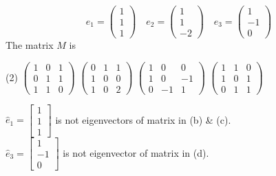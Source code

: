 \begin{questions}
\begin{minipage}{\textwidth}
	$$
	e_{1}=\left(\begin{array}{l}
	1 \\
	1 \\
	1
	\end{array}\right) \quad e_{2}=\left(\begin{array}{c}
	1 \\
	1 \\
	-2
	\end{array}\right) \quad e_{3}=\left(\begin{array}{c}
	1 \\
	-1 \\
	0
	\end{array}\right)
	$$
	The matrix $M$ is
\end{minipage}
\begin{tasks}(2)
	\task[\textbf{A.}] $\left(\begin{array}{lll}1 & 0 & 1 \\ 0 & 1 & 1 \\ 1 & 1 & 0\end{array}\right)$
	\task[\textbf{B.}]   $\left(\begin{array}{lll}0 & 1 & 1 \\ 1 & 0 & 0 \\ 1 & 0 & 2\end{array}\right)$
	\task[\textbf{C.}] $\left(\begin{array}{ccc}1 & 0 & 0 \\ 1 & 0 & -1 \\ 0 & -1 & 1\end{array}\right)$
	\task[\textbf{D.}] $\left(\begin{array}{lll}1 & 1 & 0 \\ 1 & 0 & 1 \\ 0 & 1 & 1\end{array}\right)$
\end{tasks}
\begin{answer}
	$\hat{e}_{1}=\left[\begin{array}{l}1 \\ 1 \\ 1\end{array}\right]$ is not eigenvectors of matrix in (b) \& (c).\\
	$\hat{e}_{3}=\left[\begin{array}{c}1 \\ -1 \\ 0\end{array}\right]$ is not eigenvector of matrix in (d).\\

\end{answer}
\end{questions}
